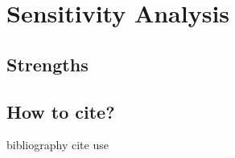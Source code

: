 \documentclass{mcmthesis}
\begin{document}
\section{Sensitivity Analysis}

\subsection{Strengths}

\subsection{How to cite?}
bibliography cite use \cite{1}


\begin{thebibliography}{99}
    

\end{thebibliography}
\end{document}
